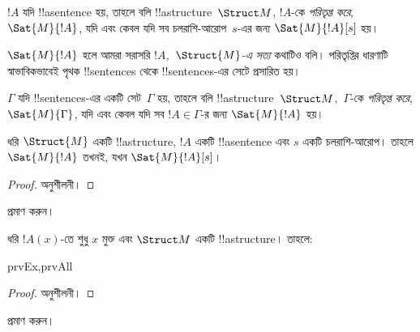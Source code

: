 \documentclass[../../../include/open-logic-section]{subfiles}
\begin{document}
\begin{defn}
$!A$ যদি !!a{sentence} হয়, তাহলে বলি !!a{structure}~$\Struct M$,
$!A$-কে \emph{পরিতৃপ্ত করে}, $\Sat{M}{!A}$, যদি এবং কেবল যদি সব
চলরাশি-আরোপ~$s$-এর জন্য $\Sat{M}{!A}[s]$ হয়।
\end{defn}

$\Sat{M}{!A}$ হলে আমরা সরাসরি \emph{$!A$,~$\Struct{M}$-এ সত্য} কথাটিও
বলি। পরিতৃপ্তির ধারণাটি স্বাভাবিকভাবেই পৃথক !!{sentence}s থেকে
!!{sentence}s-এর সেটে প্রসারিত হয়।

\begin{defn}
$\Gamma$ যদি !!{sentence}s-এর একটি সেট~$\Gamma$ হয়, তাহলে বলি
!!a{structure}~$\Struct M$,~$\Gamma$-কে \emph{পরিতৃপ্ত করে},
$\Sat{M}{\Gamma}$, যদি এবং কেবল যদি সব $!A \in \Gamma$-র জন্য
$\Sat{M}{!A}$ হয়।
\end{defn}

\begin{prop}
  ধরি $\Struct{M}$ একটি !!a{structure}, $!A$ একটি !!a{sentence} এবং
  $s$ একটি চলরাশি-আরোপ। তাহলে $\Sat{M}{!A}$ তখনই, যখন
  $\Sat{M}{!A}[s]$।
\end{prop}

\begin{proof}
অনুশীলনী।
\end{proof}

\begin{prob}
 প্রমাণ করুন।
\end{prob}

\begin{prop}
  ধরি $!A(x)$-তে শুধু $x$ মুক্ত এবং $\Struct M$ একটি
  !!a{structure}। তাহলে:
  \begin{tagenumerate}{prvEx,prvAll}
\end{tagenumerate}
\end{prop}

\begin{proof}
অনুশীলনী।
\end{proof}

\begin{prob}
 প্রমাণ করুন।
\end{prob}
\end{document}
